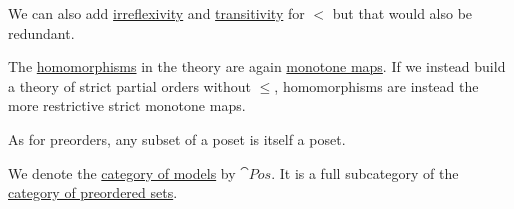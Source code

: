 \begin{definition}
\begin{thmenum}[resume=def:poset]
    We can also add \hyperref[def:binary_relation/irreflexive]{irreflexivity} and \hyperref[def:binary_relation/transitive]{transitivity} for \( < \) but that would also be redundant.

     The \hyperref[def:first_order_homomorphism]{homomorphisms} in the theory are again \hyperref[def:poset/homomorphism]{monotone maps}. If we instead build a theory of strict partial orders without \( \leq \), homomorphisms are instead the more restrictive strict monotone maps.

     As for preorders, any subset of a poset is itself a poset.

     We denote the \hyperref[def:category_of_first_order_models]{category of models} by \( \cat{Pos} \). It is a full subcategory of the \hyperref[def:preordered_set/category]{category of preordered sets}.
  \end{thmenum}
\end{definition}
